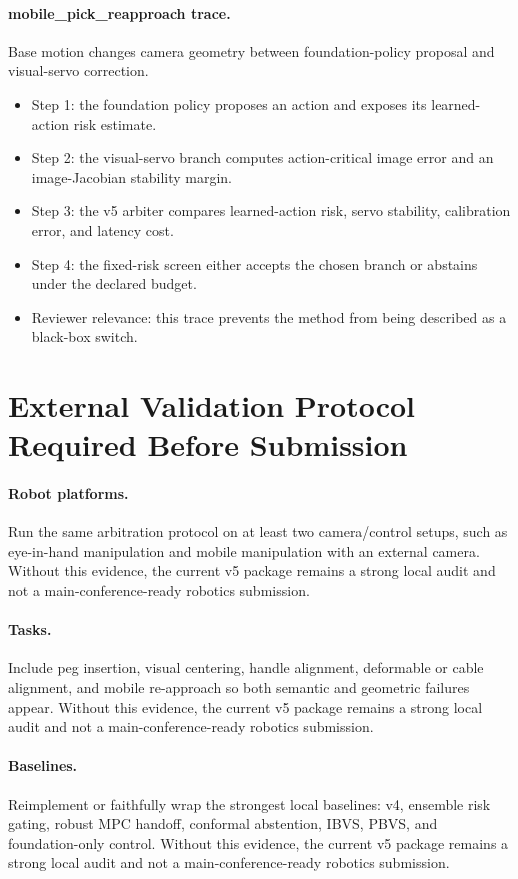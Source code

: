 \documentclass{article}
\begin{document}
\paragraph{mobile\_pick\_reapproach trace.} Base motion changes camera geometry between foundation-policy proposal and visual-servo correction.
\begin{itemize}
\item Step 1: the foundation policy proposes an action and exposes its learned-action risk estimate.
\item Step 2: the visual-servo branch computes action-critical image error and an image-Jacobian stability margin.
\item Step 3: the v5 arbiter compares learned-action risk, servo stability, calibration error, and latency cost.
\item Step 4: the fixed-risk screen either accepts the chosen branch or abstains under the declared budget.
\item Reviewer relevance: this trace prevents the method from being described as a black-box switch.
\end{itemize}
\clearpage
\section{External Validation Protocol Required Before Submission}
\paragraph{Robot platforms.} Run the same arbitration protocol on at least two camera/control setups, such as eye-in-hand manipulation and mobile manipulation with an external camera. Without this evidence, the current v5 package remains a strong local audit and not a main-conference-ready robotics submission.
\paragraph{Tasks.} Include peg insertion, visual centering, handle alignment, deformable or cable alignment, and mobile re-approach so both semantic and geometric failures appear. Without this evidence, the current v5 package remains a strong local audit and not a main-conference-ready robotics submission.
\paragraph{Baselines.} Reimplement or faithfully wrap the strongest local baselines: v4, ensemble risk gating, robust MPC handoff, conformal abstention, IBVS, PBVS, and foundation-only control. Without this evidence, the current v5 package remains a strong local audit and not a main-conference-ready robotics submission.
\end{document}
